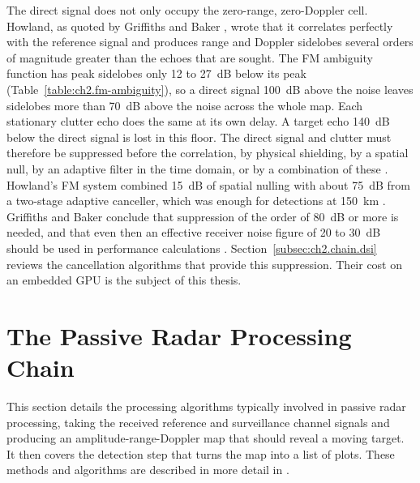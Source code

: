 The direct signal does not only occupy the zero-range, zero-Doppler cell. Howland, as quoted by Griffiths and Baker \citep{griffiths2007}, wrote that it correlates perfectly with the reference signal and produces range and Doppler sidelobes several orders of magnitude greater than the echoes that are sought. The FM ambiguity function has peak sidelobes only 12 to 27~dB below its peak (Table~\ref{table:ch2.fm-ambiguity}), so a direct signal 100~dB above the noise leaves sidelobes more than 70~dB above the noise across the whole map. Each stationary clutter echo does the same at its own delay. A target echo 140~dB below the direct signal is lost in this floor. The direct signal and clutter must therefore be suppressed before the correlation, by physical shielding, by a spatial null, by an adaptive filter in the time domain, or by a combination of these \citep{griffiths2007}. Howland's FM system combined 15~dB of spatial nulling with about 75~dB from a two-stage adaptive canceller, which was enough for detections at 150~km \citep{griffiths2007}. Griffiths and Baker conclude that suppression of the order of 80~dB or more is needed, and that even then an effective receiver noise figure of 20 to 30~dB should be used in performance calculations \citep{griffiths2007}. Section~\ref{subsec:ch2.chain.dsi} reviews the cancellation algorithms that provide this suppression. Their cost on an embedded GPU is the subject of this thesis.

\section{The Passive Radar Processing Chain}
\label{sec:ch2.chain}
\todo{}
This section details the processing algorithms typically involved in passive radar processing, taking the received reference and surveillance channel signals and producing an amplitude-range-Doppler map that should reveal a moving target. It then covers the detection step that turns the map into a list of plots. These methods and algorithms are described in more detail in .

